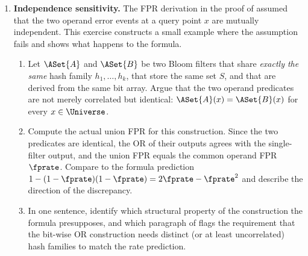 \begin{enumerate}
\item \exstarstar
\label{ex:ch6-7}
\textbf{Independence sensitivity.}
The FPR derivation in the proof of  assumed
that the two operand error events at a query point $x$ are mutually
independent. This exercise constructs a small example where the
assumption fails and shows what happens to the formula.
\begin{enumerate}
  \item[(a)] Let $\ASet{A}$ and $\ASet{B}$ be two Bloom filters that
    share \emph{exactly the same} hash family $h_1, \ldots, h_k$,
    that store the same set $S$, and that are derived from the same
    bit array. Argue that the two operand predicates are not merely
    correlated but identical: $\ASet{A}(x) = \ASet{B}(x)$ for every
    $x \in \Universe$.
  \item[(b)] Compute the actual union FPR for this construction.
    Since the two predicates are identical, the OR of their outputs
    agrees with the single-filter output, and the union FPR equals
    the common operand FPR $\fprate$. Compare to the formula
    prediction $1 - (1 - \fprate)(1 - \fprate) = 2 \fprate - \fprate^2$
    and describe the direction of the discrepancy.
  \item[(c)] In one sentence, identify which structural property of
    the construction the formula presupposes, and which paragraph of
     flags the requirement that the bit-wise
    OR construction needs distinct (or at least uncorrelated) hash
    families to match the rate prediction.
\end{enumerate}


\end{enumerate}
